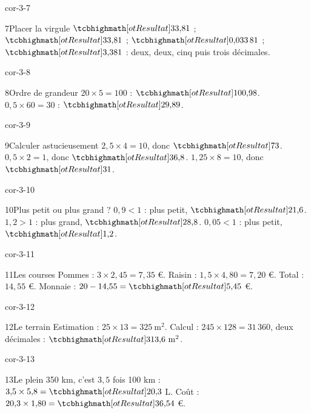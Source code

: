 \begin{blocLivre}{cor-3-7}\begin{corrige}{7}{Placer la virgule}
$\res{33{,}81}$ ; $\res{33{,}81}$ ; $\res{0{,}033\,81}$ ; $\res{3{,}381}$ : deux, deux, cinq puis trois décimales.
\end{corrige}\end{blocLivre}
\begin{blocLivre}{cor-3-8}\begin{corrige}{8}{Ordre de grandeur}
$20\times5=100$ : $\res{100{,}98}$. $0{,}5\times60=30$ : $\res{29{,}89}$.
\end{corrige}\end{blocLivre}
\begin{blocLivre}{cor-3-9}\begin{corrige}{9}{Calculer astucieusement}
$2{,}5\times4=10$, donc $\res{73}$. $0{,}5\times2=1$, donc $\res{36{,}8}$. $1{,}25\times8=10$, donc $\res{31}$.
\end{corrige}\end{blocLivre}
\begin{blocLivre}{cor-3-10}\begin{corrige}{10}{Plus petit ou plus grand ?}
$0{,}9<1$ : plus petit, $\res{21{,}6}$. $1{,}2>1$ : plus grand, $\res{28{,}8}$. $0{,}05<1$ : plus petit, $\res{1{,}2}$.
\end{corrige}\end{blocLivre}
\begin{blocLivre}{cor-3-11}\begin{corrige}{11}{Les courses}
Pommes : $3\times2{,}45=7{,}35$ €. Raisin : $1{,}5\times4{,}80=7{,}20$ €. Total : $14{,}55$ €. Monnaie : $20-14{,}55=\res{5{,}45}$ €.
\end{corrige}\end{blocLivre}
\begin{blocLivre}{cor-3-12}\begin{corrige}{12}{Le terrain}
Estimation : $25\times13=325\ \mathrm{m}^2$. Calcul : $245\times128=31\,360$, deux décimales : $\res{313{,}6\ \mathrm{m}^2}$.
\end{corrige}\end{blocLivre}
\begin{blocLivre}{cor-3-13}\begin{corrige}{13}{Le plein}
350 km, c’est $3{,}5$ fois 100 km : $3{,}5\times5{,}8=\res{20{,}3}$ L. Coût : $20{,}3\times1{,}80=\res{36{,}54}$ €.
\end{corrige}\end{blocLivre}
